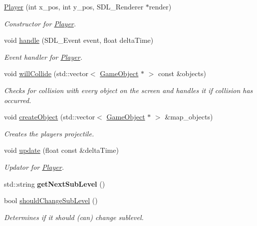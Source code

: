 \begin{DoxyCompactItemize}
\item 
\hyperlink{class_player_a38a728782dce5a00c9afc53f35541ba1}{Player} (int x\+\_\+pos, int y\+\_\+pos, S\+D\+L\+\_\+\+Renderer $\ast$render)
\begin{DoxyCompactList}\small\item\em Constructor for \hyperlink{class_player}{Player}. \end{DoxyCompactList}\item 
void \hyperlink{class_player_af4975b4e4ee42b8cce9e5d4c58e0c3d2}{handle} (S\+D\+L\+\_\+\+Event event, float delta\+Time)
\begin{DoxyCompactList}\small\item\em Event handler for \hyperlink{class_player}{Player}. \end{DoxyCompactList}\item 
void \hyperlink{class_player_a731b1520afe3330d9fadd7a96512f935}{will\+Collide} (std\+::vector$<$ \hyperlink{class_game_object}{Game\+Object} $\ast$ $>$ const \&objects)
\begin{DoxyCompactList}\small\item\em Checks for collision with every object on the screen and handles it if collision has occurred. \end{DoxyCompactList}\item 
void \hyperlink{class_player_a89be03c84da08f8a10158da5144a484f}{create\+Object} (std\+::vector$<$ \hyperlink{class_game_object}{Game\+Object} $\ast$ $>$ \&map\+\_\+objects)
\begin{DoxyCompactList}\small\item\em Creates the players projectile. \end{DoxyCompactList}\item 
void \hyperlink{class_player_a5c4e438772f28154277cf326272d8a86}{update} (float const \&delta\+Time)
\begin{DoxyCompactList}\small\item\em Updator for \hyperlink{class_player}{Player}. \end{DoxyCompactList}\item 
\hypertarget{class_player_a3a3cb6f5b734b7a64ee78b121e1e4797}{}std\+::string {\bfseries get\+Next\+Sub\+Level} ()\label{class_player_a3a3cb6f5b734b7a64ee78b121e1e4797}

\item 
bool \hyperlink{class_player_a175d4becaf0de5ceaa7c1b4c1f8d697a}{should\+Change\+Sub\+Level} ()
\begin{DoxyCompactList}\small\item\em Determines if it should (can) change sublevel. \end{DoxyCompactList}\end{DoxyCompactItemize}

